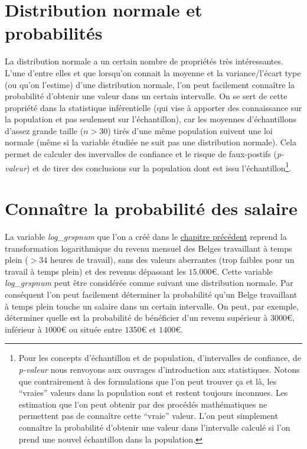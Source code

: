 \documentclass[
]{book}
\begin{document}
\hypertarget{distribution_normale_proba}{%
\section{Distribution normale et probabilités}\label{distribution_normale_proba}}

La distribution normale a un certain nombre de propriétés très intéressantes. L'une d'entre elles et que lorsqu'on connait la moyenne et la variance/l'écart type (ou qu'on l'estime) d'une distribution normale, l'on peut facilement connaître la probabilité d'obtenir une valeur dans un certain intervalle. On se sert de cette propriété dans la statistique inférentielle (qui vise à apporter des connaissance sur la population et pas seulement sur l'échantillon), car les moyennes d'échantillons d'assez grande taille (\(n>30\)) tirés d'une même population suivent une loi normale (même si la variable étudiée ne suit pas une distribution normale). Cela permet de calculer des invervalles de confiance et le risque de faux-postifs (\emph{p-valeur}) et de tirer des conclusions sur la population dont est issu l'échantillon\footnote{Pour les concepts d'échantillon et de population, d'intervalles de confiance, de \emph{p-valeur} nous renvoyons aux ouvrages d'introduction aux statistiques. Notons que contrairement à des formulations que l'on peut trouver ça et là, les ``vraies'' valeurs dans la population sont et restent toujours inconnues. Les estimation que l'on peut obtenir par des procédés mathématiques ne permettent pas de connaître cette ``vraie'' valeur. L'on peut simplement connaître la probabilité d'obtenir une valeur dans l'intervalle calculé si l'on prend une nouvel échantillon dans la population.}.

\hypertarget{connauxeetre-la-probabilituxe9-des-salaire}{%
\section{Connaître la probabilité des salaire}\label{connauxeetre-la-probabilituxe9-des-salaire}}

La variable \emph{log\_grspnum} que l'on a créé dans le \protect\hyperlink{trans_log_grspnum}{chapitre précédent} reprend la transformation logarithmique du revenu mensuel des Belges travaillant à temps plein (\(>34\) heures de travail), sans des valeurs aberrantes (trop faibles pour un travail à temps plein) et des revenus dépassant les \(15.000€\). Cette variable \emph{log\_grspnum} peut être considérée comme suivant une distribution normale. Par conséquent l'on peut facilement déterminer la probabilité qu'un Belge travaillant à temps plein touche un salaire dans un certain intervalle. On peut, par exemple, déterminer quelle est la probabilité de bénéficier d'un revenu supérieur à \(3000€\), inférieur à \(1000€\) ou située entre \(1350€\) et \(1400€\).
\end{document}
